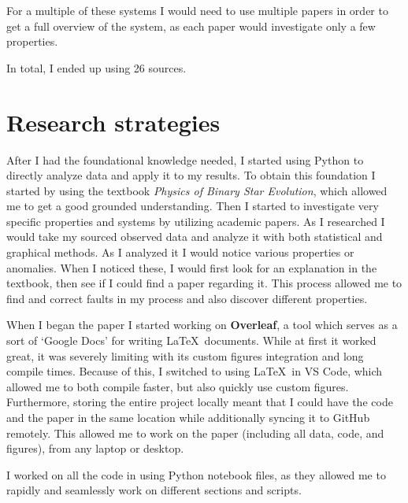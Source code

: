 \documentclass[12pt, a4paper]{article}
\begin{document}
    For a multiple of these systems I would need to use multiple papers in order to get a full overview of the system, as each paper would investigate only a few properties.

    In total, I ended up using 26 sources.
\section{Research strategies}
   After I had the foundational knowledge needed, I started using Python to directly analyze data and apply it to my results. To obtain this foundation I started by using the textbook \textit{Physics of Binary Star Evolution}, which allowed me to get a good grounded understanding. Then I started to investigate very specific properties and systems by utilizing academic papers. As I researched I would take my sourced observed data and analyze it with both statistical and graphical methods. As I analyzed it I would notice various properties or anomalies. When I noticed these, I would first look for an explanation in the textbook, then see if I could find a paper regarding it. This process allowed me to find and correct faults in my process and also discover different properties.

   When I began the paper I started working on \textbf{Overleaf}, a tool which serves as a sort of `Google Docs' for writing \LaTeX~documents. While at first it worked great, it was severely limiting with its custom figures integration and long compile times. Because of this, I switched to using \LaTeX~in VS Code, which allowed me to both compile faster, but also quickly use custom figures. Furthermore, storing the entire project locally meant that I could have the code and the paper in the same location while additionally syncing it to GitHub remotely. This allowed me to work on the paper (including all data, code, and figures), from any laptop or desktop.  

   I worked on all the code in using Python notebook files, as they allowed me to rapidly and seamlessly work on different sections and scripts.
\end{document}
